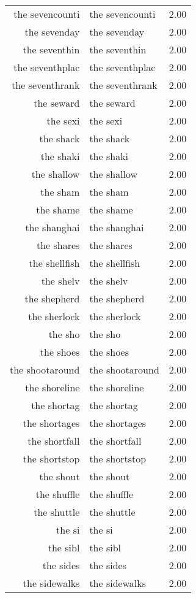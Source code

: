 \begin{table}[ht]
\begin{tabular}{rlr}
  the sevencounti & the sevencounti & 2.00 \\ 
  the sevenday & the sevenday & 2.00 \\ 
  the seventhin & the seventhin & 2.00 \\ 
  the seventhplac & the seventhplac & 2.00 \\ 
  the seventhrank & the seventhrank & 2.00 \\ 
  the seward & the seward & 2.00 \\ 
  the sexi & the sexi & 2.00 \\ 
  the shack & the shack & 2.00 \\ 
  the shaki & the shaki & 2.00 \\ 
  the shallow & the shallow & 2.00 \\ 
  the sham & the sham & 2.00 \\ 
  the shame & the shame & 2.00 \\ 
  the shanghai & the shanghai & 2.00 \\ 
  the shares & the shares & 2.00 \\ 
  the shellfish & the shellfish & 2.00 \\ 
  the shelv & the shelv & 2.00 \\ 
  the shepherd & the shepherd & 2.00 \\ 
  the sherlock & the sherlock & 2.00 \\ 
  the sho & the sho & 2.00 \\ 
  the shoes & the shoes & 2.00 \\ 
  the shootaround & the shootaround & 2.00 \\ 
  the shoreline & the shoreline & 2.00 \\ 
  the shortag & the shortag & 2.00 \\ 
  the shortages & the shortages & 2.00 \\ 
  the shortfall & the shortfall & 2.00 \\ 
  the shortstop & the shortstop & 2.00 \\ 
  the shout & the shout & 2.00 \\ 
  the shuffle & the shuffle & 2.00 \\ 
  the shuttle & the shuttle & 2.00 \\ 
  the si & the si & 2.00 \\ 
  the sibl & the sibl & 2.00 \\ 
  the sides & the sides & 2.00 \\ 
  the sidewalks & the sidewalks & 2.00 \\ 

\end{tabular}
\end{table}
